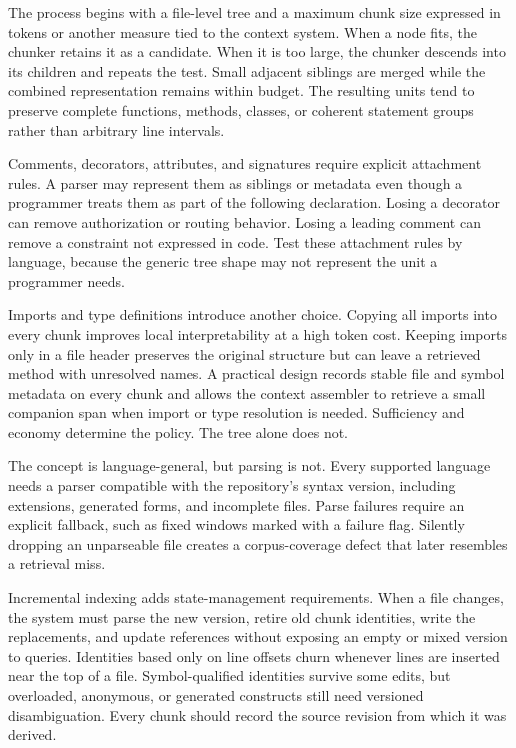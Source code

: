 The process begins with a file-level tree and a maximum chunk size expressed in tokens or another measure tied to the context system. When a node fits, the chunker retains it as a candidate. When it is too large, the chunker descends into its children and repeats the test. Small adjacent siblings are merged while the combined representation remains within budget. The resulting units tend to preserve complete functions, methods, classes, or coherent statement groups rather than arbitrary line intervals.

Comments, decorators, attributes, and signatures require explicit attachment rules. A parser may represent them as siblings or metadata even though a programmer treats them as part of the following declaration. Losing a decorator can remove authorization or routing behavior. Losing a leading comment can remove a constraint not expressed in code. Test these attachment rules by language, because the generic tree shape may not represent the unit a programmer needs.

Imports and type definitions introduce another choice. Copying all imports into every chunk improves local interpretability at a high token cost. Keeping imports only in a file header preserves the original structure but can leave a retrieved method with unresolved names. A practical design records stable file and symbol metadata on every chunk and allows the context assembler to retrieve a small companion span when import or type resolution is needed. Sufficiency and economy determine the policy. The tree alone does not.

The concept is language-general, but parsing is not. Every supported language needs a parser compatible with the repository's syntax version, including extensions, generated forms, and incomplete files. Parse failures require an explicit fallback, such as fixed windows marked with a failure flag. Silently dropping an unparseable file creates a corpus-coverage defect that later resembles a retrieval miss.

Incremental indexing adds state-management requirements. When a file changes, the system must parse the new version, retire old chunk identities, write the replacements, and update references without exposing an empty or mixed version to queries. Identities based only on line offsets churn whenever lines are inserted near the top of a file. Symbol-qualified identities survive some edits, but overloaded, anonymous, or generated constructs still need versioned disambiguation. Every chunk should record the source revision from which it was derived.


